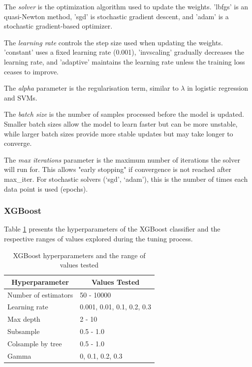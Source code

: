 The \textit{solver} is the optimization algorithm used to update the weights. 'lbfgs' is an quasi-Newton method, 'sgd' is stochastic gradient descent, and 'adam' is a stochastic gradient-based optimizer.

The \textit{learning rate} controls the step size used when updating the weights. 'constant' uses a fixed learning rate (0.001), 'invscaling' gradually decreases the learning rate, and 'adaptive' maintains the learning rate unless the training loss ceases to improve.

The \textit{alpha} parameter is the regularisation term, similar to $\lambda$ in logistic regression and SVMs.

The \textit{batch size} is the number of samples processed before the model is updated. Smaller batch sizes allow the model to learn faster but can be more unstable, while larger batch sizes provide more stable updates but may take longer to converge.

The \textit{max iterations} parameter is the maximum number of iterations the solver will run for. This allows "early stopping" if convergence is not reached after max\_iter. For stochastic solvers (‘sgd’, ‘adam’), this is the number of times each data point is used (epochs).

\subsubsection{XGBoost}
Table \ref{tab:xgb_params} presents the hyperparameters of the XGBoost classifier and the respective ranges of values explored during the tuning process.

\begin{table}[h]
	\centering
	\begin{tabular}{ll}
		\toprule
		\multicolumn{1}{c}{\textbf{Hyperparameter}} & \multicolumn{1}{c}{\textbf{Values Tested}} \\
		\midrule
		Number of estimators	  				  & 50 - 10000 \\
		Learning rate        					  & 0.001, 0.01, 0.1, 0.2, 0.3 \\
		Max depth            					  & 2 - 10 \\
		Subsample 								  & 0.5 - 1.0 \\
		Colsample by tree 					 	  & 0.5 - 1.0 \\
		Gamma 									  & 0, 0.1, 0.2, 0.3 \\
		\bottomrule
	\end{tabular}
	\caption{XGBoost hyperparameters and the range of values tested}
	\label{tab:xgb_params}
\end{table}

